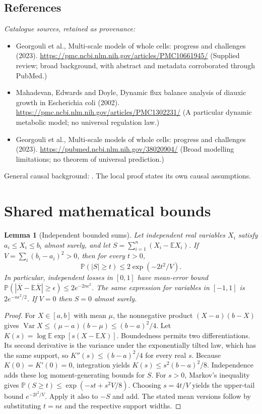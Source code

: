 \documentclass[11pt]{article}
\newcommand{\E}{\mathbb E}
\newcommand{\Prob}{\mathbb P}
\DeclareMathOperator{\Var}{Var}
\providecommand{\E}{\mathbb E}
\providecommand{\Prob}{\mathbb P}
\providecommand{\Var}{\operatorname{Var}}
\newtheorem{sharedlemma}{Lemma}[section]
\begin{document}
\subsection{References}
\noindent\emph{Catalogue sources, retained as provenance:}
\begin{itemize}
\item Georgouli et al., Multi-scale models of whole cells: progress and challenges (2023). \url{https://pmc.ncbi.nlm.nih.gov/articles/PMC10661945/} (Supplied review; broad background, with abstract and metadata corroborated through PubMed.)
\item Mahadevan, Edwards and Doyle, Dynamic flux balance analysis of diauxic growth in Escherichia coli (2002). \url{https://pmc.ncbi.nlm.nih.gov/articles/PMC1302231/} (A particular dynamic metabolic model; no universal regulation law.)
\item Georgouli et al., Multi-scale models of whole cells: progress and challenges (2023). \url{https://pubmed.ncbi.nlm.nih.gov/38020904/} (Broad modelling limitations; no theorem of universal prediction.)
\end{itemize}
\noindent General causal background: \cite{pearl}. The local proof states its own causal assumptions.
\clearpage


\appendix
\section{Shared mathematical bounds}\label{app:bounds}
\begin{sharedlemma}[Independent bounded sums]\label{lem:bounded}
Let independent real variables $X_i$ satisfy $a_i\leq X_i\leq b_i$ almost surely,
and let $S=\sum_{i=1}^n(X_i-\E X_i)$. If
$V=\sum_i(b_i-a_i)^2>0$, then for every $t>0$,
\[
 \Prob(|S|\geq t)\leq 2\exp(-2t^2/V).
\]
In particular, independent losses in $[0,1]$ have mean-error bound
$\Prob(|\overline X-\E\overline X|\geq\epsilon)
\leq2e^{-2n\epsilon^2}$. The same expression for variables in $[-1,1]$
is $2e^{-n\epsilon^2/2}$. If $V=0$ then $S=0$ almost surely.
\end{sharedlemma}
\begin{proof}
For $X\in[a,b]$ with mean $\mu$, the nonnegative product
$(X-a)(b-X)$ gives
$\Var X\leq(\mu-a)(b-\mu)\leq(b-a)^2/4$.
Let $K(s)=\log\E\exp[s(X-\E X)]$.
Boundedness permits two differentiations. Its second derivative is the variance
under the exponentially tilted law, which has the same support, so
$K''(s)\leq(b-a)^2/4$ for every real $s$.
Because $K(0)=K'(0)=0$, integration yields
$K(s)\leq s^2(b-a)^2/8$.
Independence adds these log moment-generating bounds for $S$.
For $s>0$, Markov's inequality gives
$\Prob(S\geq t)\leq\exp(-st+s^2V/8)$.
Choosing $s=4t/V$ yields the upper-tail bound $e^{-2t^2/V}$.
Apply it also to $-S$ and add. The stated mean versions follow by substituting
$t=n\epsilon$ and the respective support widths.
\end{proof}
\end{document}
